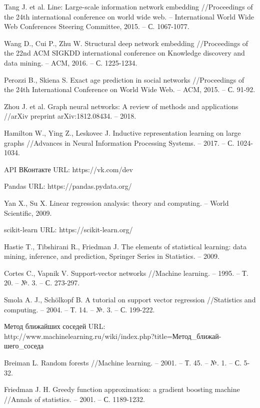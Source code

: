 \begin{thebibliography}{9}
Tang J. et al. Line: Large-scale information network embedding //Proceedings of the 24th international conference on world wide web. – International World Wide Web Conferences Steering Committee, 2015. – С. 1067-1077.

Wang D., Cui P., Zhu W. Structural deep network embedding //Proceedings of the 22nd ACM SIGKDD international conference on Knowledge discovery and data mining. – ACM, 2016. – С. 1225-1234.

Perozzi B., Skiena S. Exact age prediction in social networks //Proceedings of the 24th International Conference on World Wide Web. – ACM, 2015. – С. 91-92.

Zhou J. et al. Graph neural networks: A review of methods and applications //arXiv preprint arXiv:1812.08434. – 2018.

Hamilton W., Ying Z., Leskovec J. Inductive representation learning on large graphs //Advances in Neural Information Processing Systems. – 2017. – С. 1024-1034.

API ВКонтакте URL: https://vk.com/dev

Pandas URL: https://pandas.pydata.org/

Yan X., Su X. Linear regression analysis: theory and computing. – World Scientific, 2009.

scikit-learn URL: https://scikit-learn.org/

Hastie T., Tibshirani R., Friedman J. The elements of statistical learning: data mining, inference, and prediction, Springer Series in Statistics. – 2009.

Cortes C., Vapnik V. Support-vector networks //Machine learning. – 1995. – Т. 20. – №. 3. – С. 273-297.

Smola A. J., Schölkopf B. A tutorial on support vector regression //Statistics and computing. – 2004. – Т. 14. – №. 3. – С. 199-222.

Метод ближайших соседей URL: \\
http://www.machinelearning.ru/wiki/index.php?title=Метод\_ближай-шего\_соседа

Breiman L. Random forests //Machine learning. – 2001. – Т. 45. – №. 1. – С. 5-32.

Friedman J. H. Greedy function approximation: a gradient boosting machine //Annals of statistics. – 2001. – С. 1189-1232.


\end{thebibliography}
